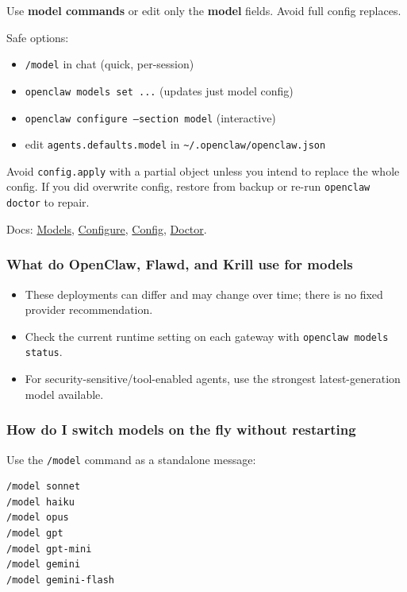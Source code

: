 Use \textbf{model commands} or edit only the \textbf{model} fields. Avoid full config replaces.

Safe options:

\begin{itemize}
  \item \texttt{/model} in chat (quick, per-session)
  \item \texttt{openclaw models set ...} (updates just model config)
  \item \texttt{openclaw configure --section model} (interactive)
  \item edit \texttt{agents.defaults.model} in \texttt{\textasciitilde{}/.openclaw/openclaw.json}
\end{itemize}


Avoid \texttt{config.apply} with a partial object unless you intend to replace the whole config.
If you did overwrite config, restore from backup or re-run \texttt{openclaw doctor} to repair.

Docs: \href{/concepts/models}{Models}, \href{/cli/configure}{Configure}, \href{/cli/config}{Config}, \href{/gateway/doctor}{Doctor}.

\subsubsection{What do OpenClaw, Flawd, and Krill use for models}


\begin{itemize}
  \item These deployments can differ and may change over time; there is no fixed provider recommendation.
  \item Check the current runtime setting on each gateway with \texttt{openclaw models status}.
  \item For security-sensitive/tool-enabled agents, use the strongest latest-generation model available.
\end{itemize}


\subsubsection{How do I switch models on the fly without restarting}


Use the \texttt{/model} command as a standalone message:

\begin{lstlisting}
/model sonnet
/model haiku
/model opus
/model gpt
/model gpt-mini
/model gemini
/model gemini-flash
\end{lstlisting}


